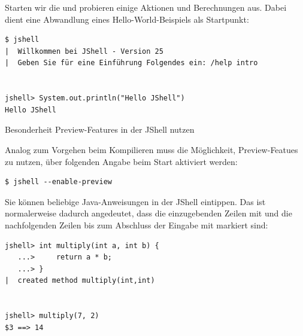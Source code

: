 Starten wir die  und probieren einige Aktionen und Berechnungen aus.
Dabei dient eine Abwandlung eines Hello-World-Beispiels als Startpunkt:


\vspace{-0.75mm}
\begin{lstlisting}
$ jshell
|  Willkommen bei JShell - Version 25
|  Geben Sie für eine Einführung Folgendes ein: /help intro


jshell> System.out.println("Hello JShell")
Hello JShell
\end{lstlisting}
\vspace{-0.75mm}




\begin{praxistipp}{Besonderheit Preview-Features in der JShell nutzen}
\begin{center}
\begin{minipage}{\textwidth-0.6cm}
Analog zum Vorgehen beim Kompilieren muss die Möglichkeit, Preview-Featues zu nutzen,
über folgenden Angabe beim Start aktiviert werden:


\vspace{-0.75mm}
\begin{lstlisting}
$ jshell --enable-preview
\end{lstlisting}
\vspace{-3mm}
\end{minipage}
\end{center}
\end{praxistipp}


\noindent
Sie können  beliebige Java-Anweisungen in der JShell eintippen.
Das ist normalerweise dadurch angedeutet, dass die einzugebenden Zeilen
mit  und die nachfolgenden Zeilen bis zum Abschluss der Eingabe mit  markiert sind:


\vspace{-0.75mm}
\begin{lstlisting}
jshell> int multiply(int a, int b) {
   ...>     return a * b;
   ...> }
|  created method multiply(int,int)


jshell> multiply(7, 2)
$3 ==> 14
\end{lstlisting}
\vspace{-0.75mm}


